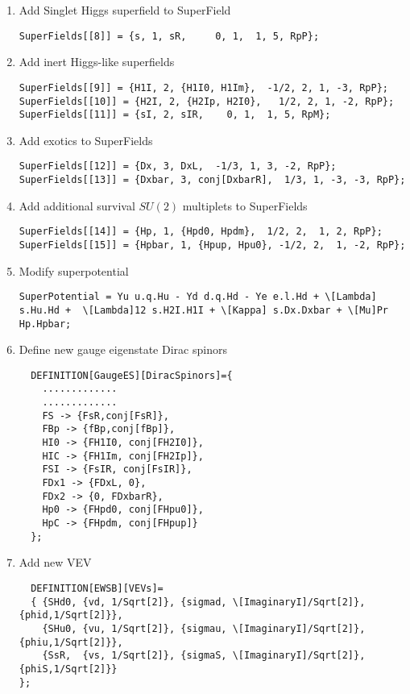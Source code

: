 \documentclass[final,3p,times,pdflatex]{elsarticle}
\begin{document}
\begin{enumerate}
\begin{enumerate}
\item Add Singlet Higgs superfield to SuperField
\begin{lstlisting}
SuperFields[[8]] = {s, 1, sR,     0, 1,  1, 5, RpP};
\end{lstlisting}
\item Add inert Higgs-like superfields 
\begin{lstlisting}
SuperFields[[9]] = {H1I, 2, {H1I0, H1Im},  -1/2, 2, 1, -3, RpP};
SuperFields[[10]] = {H2I, 2, {H2Ip, H2I0},   1/2, 2, 1, -2, RpP};
SuperFields[[11]] = {sI, 2, sIR,    0, 1,  1, 5, RpM};
\end{lstlisting}
\item Add exotics to SuperFields
\begin{lstlisting}
SuperFields[[12]] = {Dx, 3, DxL,  -1/3, 1, 3, -2, RpP};
SuperFields[[13]] = {Dxbar, 3, conj[DxbarR],  1/3, 1, -3, -3, RpP};
\end{lstlisting}
\item Add additional survival $SU(2)$ multiplets to SuperFields
\begin{lstlisting}
SuperFields[[14]] = {Hp, 1, {Hpd0, Hpdm},  1/2, 2,  1, 2, RpP};
SuperFields[[15]] = {Hpbar, 1, {Hpup, Hpu0}, -1/2, 2,  1, -2, RpP};
\end{lstlisting}
\item Modify superpotential
\begin{lstlisting}
SuperPotential = Yu u.q.Hu - Yd d.q.Hd - Ye e.l.Hd + \[Lambda] s.Hu.Hd +  \[Lambda]12 s.H2I.H1I + \[Kappa] s.Dx.Dxbar + \[Mu]Pr Hp.Hpbar;
\end{lstlisting}
\item Define new gauge eigenstate Dirac spinors
\begin{lstlisting}
  DEFINITION[GaugeES][DiracSpinors]={
    .............
    .............
    FS -> {FsR,conj[FsR]},
    FBp -> {fBp,conj[fBp]},
    HI0 -> {FH1I0, conj[FH2I0]},
    HIC -> {FH1Im, conj[FH2Ip]},
    FSI -> {FsIR, conj[FsIR]},
    FDx1 -> {FDxL, 0},
    FDx2 -> {0, FDxbarR}, 
    Hp0 -> {FHpd0, conj[FHpu0]},
    HpC -> {FHpdm, conj[FHpup]}
  };
\end{lstlisting}
\item Add new VEV
\begin{lstlisting} 
  DEFINITION[EWSB][VEVs]= 
  { {SHd0, {vd, 1/Sqrt[2]}, {sigmad, \[ImaginaryI]/Sqrt[2]},{phid,1/Sqrt[2]}},
    {SHu0, {vu, 1/Sqrt[2]}, {sigmau, \[ImaginaryI]/Sqrt[2]},{phiu,1/Sqrt[2]}},
    {SsR,  {vs, 1/Sqrt[2]}, {sigmaS, \[ImaginaryI]/Sqrt[2]},{phiS,1/Sqrt[2]}}
};
\end{lstlisting}

\end{enumerate}
\end{enumerate}
\end{document}
